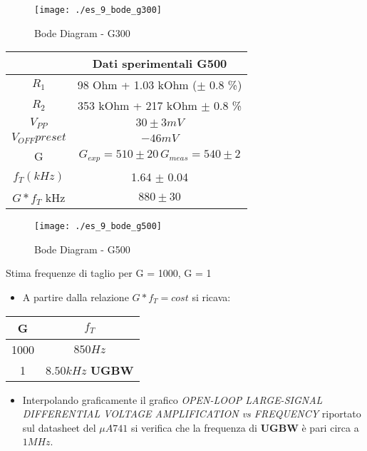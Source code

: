 \documentclass{beamer}
\begin{document}
\begin{frame}
\begin{figure}
\centering
\texttt{[image: ./es\_9\_bode\_g300]}
\caption{Bode Diagram - G300}
\label{fig:es_9_bode_g300}
\end{figure}
\end{frame}

\begin{frame}

{
\centering
\begin{tabular}{|c|c|}
\hline  &  \textbf{Dati sperimentali G500} \\ 
\hline $R_1$  &  98 \si{Ohm} + 1.03 \si{kOhm} ($\pm$ 0.8 \%) \\ 
\hline $R_2$ & 353 \si{kOhm} + 217  \si{kOhm} $\pm$ 0.8 \%  \\ 
\hline $V_{PP}$ & $ 30  \pm 3 \si{mV} $ \\ 
\hline $V_{OFF} preset$ & $ -46  \si{mV} $ \\
\hline G &  $G_{exp}  = 510 \pm 20  \, G_{meas} = 540 \pm 2 $ \\ 
\hline $f_T (kHz)$ &  1.64 $\pm$ 0.04 \\
\hline $G*f_{T}$ \si{kHz} & $ 880 \pm 30 $\\
\hline
\end{tabular} 

}

\end{frame}

\begin{frame}
\begin{figure}
\centering
\texttt{[image: ./es\_9\_bode\_g500]}
\caption{Bode Diagram - G500}
\label{fig:es_9_bode_g500}
\end{figure}

\end{frame}



\begin{frame}{Stima frequenze di taglio per G = 1000, G = 1}

\begin{itemize}
\item A partire dalla relazione $G*f_T = cost$ si ricava:
\end{itemize}

{
\centering
\begin{tabular}{|c|c|}
\hline G & $f_{T}$ \\ 
\hline 1000 &  $850 \si{Hz}$\\ 
\hline 1  &   $8.50 \si{kHz}$ \textbf{\textsc{UGBW}}\\ 
\hline 
\end{tabular}

} 

\begin{itemize}
\item Interpolando graficamente il grafico \textit{OPEN-LOOP LARGE-SIGNAL DIFFERENTIAL VOLTAGE AMPLIFICATION vs
FREQUENCY} riportato sul datasheet del $\mu A741$ si verifica che la frequenza di \textbf{\textsc{UGBW}} è pari circa a $1 \si{MHz}$.
\end{itemize}

\end{frame}
\end{document}
